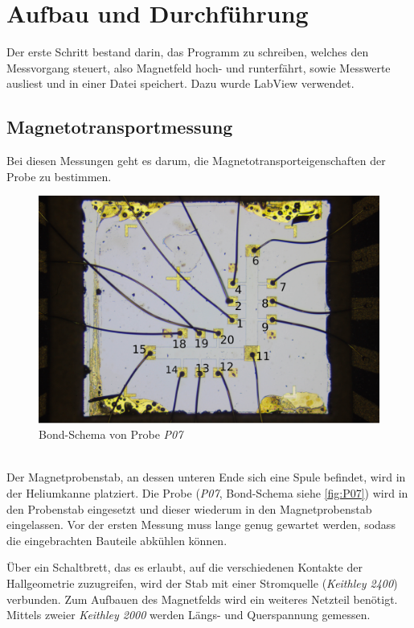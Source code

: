 \section{Aufbau und Durchführung}
Der erste Schritt bestand darin, das Programm zu schreiben, welches den Messvorgang steuert, also Magnetfeld hoch- und runterfährt, sowie Messwerte ausliest und in einer Datei speichert. Dazu wurde LabView verwendet.

\subsection{Magnetotransportmessung}\label{sec:Magnetotransport}
Bei diesen Messungen geht es darum, die Magnetotransporteigenschaften der Probe zu bestimmen.

\begin{figure}

\includegraphics[scale=0.04]{Pictures/P07BondSchema.jpg}
\caption{Bond-Schema von Probe \emph{P07}}

\label{fig:P07}

\end{figure}
\hfill\\
Der Magnetprobenstab, an dessen unteren Ende sich eine Spule befindet, wird in der Heliumkanne platziert.
Die Probe (\emph{P07}, Bond-Schema siehe \autoref{fig:P07}) wird in den Probenstab eingesetzt und dieser wiederum in den Magnetprobenstab eingelassen.
Vor der ersten Messung muss lange genug gewartet werden, sodass die eingebrachten Bauteile abkühlen können.

Über ein Schaltbrett, das es erlaubt, auf die verschiedenen Kontakte der Hallgeometrie zuzugreifen, wird der Stab mit einer Stromquelle (\emph{Keithley 2400}) verbunden.
Zum Aufbauen des Magnetfelds wird ein weiteres Netzteil benötigt.
Mittels zweier \emph{Keithley 2000} werden Längs- und Querspannung gemessen.\\

